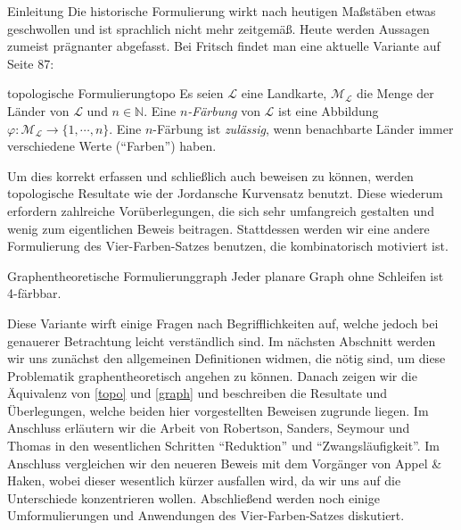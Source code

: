 \begin{chapter}{Einleitung}
 Die historische Formulierung wirkt nach heutigen Maßstäben etwas geschwollen und ist sprachlich nicht mehr zeitgemäß. Heute werden Aussagen zumeist prägnanter abgefasst. Bei Fritsch \cite{fritsch} findet man eine aktuelle Variante auf Seite 87:  
 
 \begin{satzl}{topologische Formulierung}{topo}
  Es seien $\mathcal{L}$ eine Landkarte, $\mathcal{M}_\mathcal{L}$ die Menge der Länder von $\mathcal{L}$ und $n \in \mathbb{N}$. Eine \textit{$n$-Färbung} von $\mathcal{L}$ ist eine Abbildung $\varphi: \mathcal{M}_{\mathcal{L}} \rightarrow \{1,\cdots,n\}$. Eine $n$-Färbung ist \textit{zulässig}, wenn benachbarte Länder immer verschiedene Werte (``Farben'') haben.
 \end{satzl}

 Um dies korrekt erfassen und schließlich auch beweisen zu können, werden topologische Resultate wie der Jordansche Kurvensatz benutzt. Diese wiederum erfordern zahlreiche Vorüberlegungen, die sich sehr umfangreich gestalten und wenig zum eigentlichen Beweis beitragen. Stattdessen werden wir eine andere Formulierung des Vier-Farben-Satzes benutzen, die kombinatorisch motiviert ist. 
 
 \begin{satzl}{Graphentheoretische Formulierung}{graph}
  Jeder planare Graph ohne Schleifen ist 4-färbbar.
 \end{satzl}
 
 Diese Variante wirft einige Fragen nach Begrifflichkeiten auf, welche jedoch bei genauerer Betrachtung leicht verständlich sind. Im nächsten Abschnitt werden wir uns zunächst den allgemeinen Definitionen widmen, die nötig sind, um diese Problematik graphentheoretisch angehen zu können. Danach zeigen wir die Äquivalenz von \ref{topo} und \ref{graph} und beschreiben die Resultate und Überlegungen, welche beiden hier vorgestellten Beweisen zugrunde liegen. Im Anschluss erläutern wir die Arbeit von Robertson, Sanders, Seymour und Thomas in den wesentlichen Schritten ``Reduktion'' und ``Zwangsläufigkeit''. Im Anschluss vergleichen wir den neueren Beweis mit dem Vorgänger von Appel \& Haken, wobei dieser wesentlich kürzer ausfallen wird, da wir uns auf die Unterschiede konzentrieren wollen. Abschließend werden noch einige Umformulierungen und Anwendungen des Vier-Farben-Satzes diskutiert.
\end{chapter}